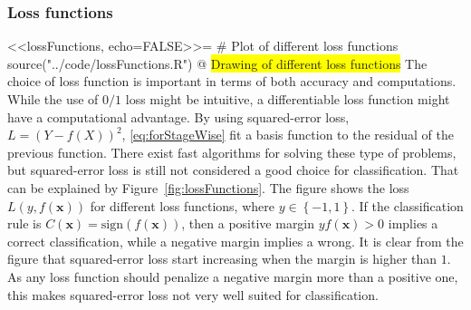 \subsubsection{Loss functions}
\label{sub:Loss functions}
<<lossFunctions, echo=FALSE>>=
# Plot of different loss functions
source("../code/lossFunctions.R")
@
\colorbox{yellow}{Drawing of different loss functions}
The choice of loss function is important in terms of both accuracy and computations. While the use of $0/1$ loss might be intuitive, a differentiable loss function might have a computational advantage. By using squared-error loss, $L = (Y - f(X))^2$, \eqref{eq:forStageWise} fit a basis function to the residual of the previous function. There exist fast algorithms for solving these type of problems, but squared-error loss is still not considered a good choice for classification. That can be explained by Figure~\ref{fig:lossFunctions}. The figure shows the loss $L(y, f(\mathbf{x}))$ for different loss functions, where $y \in \left\{ -1, 1 \right\}$. If the classification rule is $C(\mathbf{x}) = \mathrm{sign}(f(\mathbf{x}))$, then a positive margin $y f(\mathbf{x}) > 0$ implies a correct classification, while a negative margin implies a wrong. It is clear from the figure that squared-error loss start increasing when the margin is higher than $1$. As any loss function should penalize a negative margin more than a positive one, this makes squared-error loss not very well suited for classification.

